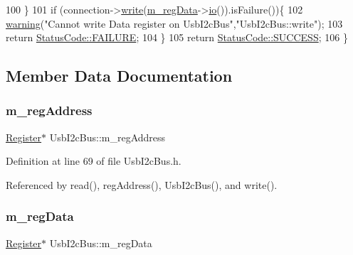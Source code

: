 \begin{DoxyCode}
100   \}
101   \textcolor{keywordflow}{if} (connection->\hyperlink{classInterface_ad665cacbaf490a26c1c4ba192022e68a}{write}(\hyperlink{classUsbI2cBus_afce60d99fce3a99d0d7d59d43a2f7ba5}{m\_regData}->\hyperlink{classIOobject_af04fb94137c3d86849f478ac5afab5d1}{io}()).isFailure())\{
102     \hyperlink{classObject_a65cd4fda577711660821fd2cd5a3b4c9}{warning}(\textcolor{stringliteral}{"Cannot write Data register on UsbI2cBus"},\textcolor{stringliteral}{"UsbI2cBus::write"});
103     \textcolor{keywordflow}{return} \hyperlink{classStatusCode_a6f565cbeadc76d14c72f047e5e85eb4ba3da73d4c469762eb9d3c960368252b26}{StatusCode::FAILURE};
104   \}
105   \textcolor{keywordflow}{return} \hyperlink{classStatusCode_a6f565cbeadc76d14c72f047e5e85eb4badd0da38d3ba0d922efd1f4619bc37ad8}{StatusCode::SUCCESS};
106 \}
\end{DoxyCode}


\subsection{Member Data Documentation}
\mbox{\label{classUsbI2cBus_ad109ed1599f94c84fb4469be8f0d174e}} 
\subsubsection{\texorpdfstring{m\+\_\+reg\+Address}{m\_regAddress}}
{\footnotesize\ttfamily \hyperlink{classRegister}{Register}$\ast$ Usb\+I2c\+Bus\+::m\+\_\+reg\+Address\hspace{0.3cm}{\ttfamily [private]}}



Definition at line 69 of file Usb\+I2c\+Bus.\+h.



Referenced by read(), reg\+Address(), Usb\+I2c\+Bus(), and write().

\mbox{\label{classUsbI2cBus_afce60d99fce3a99d0d7d59d43a2f7ba5}} 
\subsubsection{\texorpdfstring{m\+\_\+reg\+Data}{m\_regData}}
{\footnotesize\ttfamily \hyperlink{classRegister}{Register}$\ast$ Usb\+I2c\+Bus\+::m\+\_\+reg\+Data\hspace{0.3cm}{\ttfamily [private]}}




